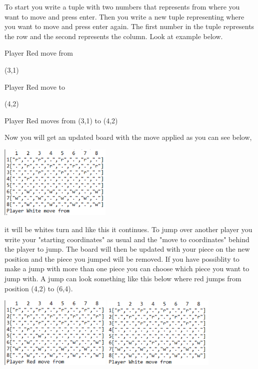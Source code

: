 \documentclass[12pt,a4paper]{article}
\begin{document}
To start you write a tuple with two numbers that represents from where you want to move and press enter. Then you write a new tuple representing where you want to move and press enter again. The first number in the tuple represents the row and the second represents the column. Look at example below.


Player Red move from

(3,1)

Player Red move to

(4,2)

Player Red moves from  (3,1)  to  (4,2)

Now you will get an updated board with the move applied as you can see below,

\begin{center}
	\includegraphics[width= 0.4\textwidth]{firstmove.PNG}
\end{center}
it will be whites turn and like this it continues. 
\newpage
To jump over another player you write your "starting coordinates" as usual and the "move to coordinates" behind the player to jump. The board will then be updated with your piece on the new position and the piece you jumped will be removed. If you have possiblity to make a jump with more than one piece you can choose which  piece you want to jump with. A jump can look something like this below where red jumps from position (4,2) to (6,4).

\begin{center}
	\includegraphics[width= 0.4\textwidth]{jump1.PNG}    \includegraphics[width= 0.4\textwidth]{jump2.PNG} 
\end{center}
\end{document}
